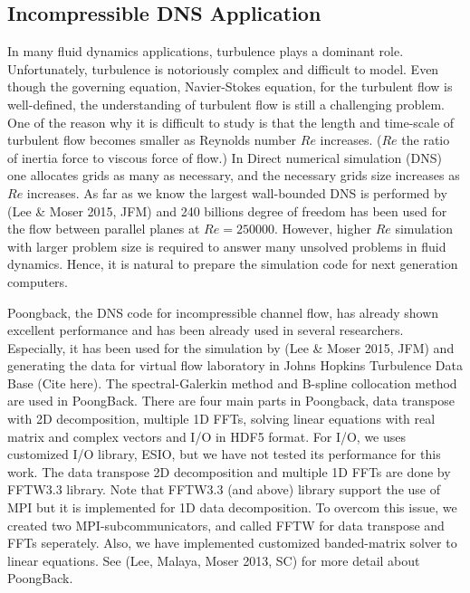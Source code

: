 \subsection{Incompressible DNS Application}
\label{sec:dns_full}

In many fluid dynamics applications, turbulence plays a
dominant role. Unfortunately, turbulence is 
notoriously complex and difficult to model. Even though the governing equation, Navier-Stokes equation, for the turbulent flow is well-defined, the understanding of turbulent flow is still a challenging problem. One of the reason why it is difficult to study is that the length and time-scale of turbulent flow becomes smaller as Reynolds number $Re$ increases. ($Re$ the ratio of inertia force to viscous force of flow.) In Direct numerical simulation (DNS) one allocates grids as many as necessary, and the necessary grids size increases as $Re$ increases. As far as we know the largest wall-bounded DNS is performed by (Lee \& Moser 2015, JFM) and 240 billions degree of freedom has been used for the flow between parallel planes at $Re = 250000$. However, higher $Re$ simulation with larger problem size is required to answer many unsolved problems in fluid dynamics. Hence, it is natural to prepare the simulation code for next generation computers.

Poongback, the DNS code for incompressible channel flow, has already shown excellent performance and has been already used in several researchers. Especially, it has been used for the simulation by (Lee \& Moser 2015, JFM) and generating the data for virtual flow laboratory in Johns Hopkins Turbulence Data Base (Cite here). The spectral-Galerkin method and B-spline collocation method are used in PoongBack. There are four main parts in Poongback, data transpose with 2D decomposition, multiple 1D FFTs, solving linear equations with real matrix and complex vectors and I/O in HDF5 format. For I/O, we uses customized I/O library, ESIO, but we have not tested its performance for this work. The data transpose 2D decomposition and multiple 1D FFTs are done by FFTW3.3 library. Note that FFTW3.3 (and above) library support the use of MPI but it is implemented for 1D data decomposition. To overcom this issue, we created two MPI-subcommunicators, and called FFTW for data transpose and FFTs seperately. Also, we have implemented customized banded-matrix solver to linear equations. See (Lee, Malaya, Moser 2013, SC) for more detail about PoongBack.

